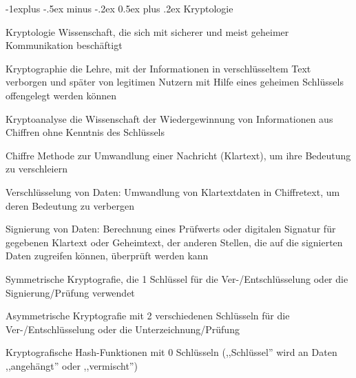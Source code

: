 \documentclass[a4paper]{article}
\makeatletter
\renewcommand{\subsection}{\@startsection{subsection}{2}{0mm}%
 {-1explus -.5ex minus -.2ex}%
 {0.5ex plus .2ex}%
 {\normalfont\normalsize\bfseries}}
\makeatother
\begin{document}
\begin{multicols}{3}
      \subsection{Kryptologie}
      \begin{description*}
            \item[Kryptologie] Wissenschaft, die sich mit sicherer und meist geheimer Kommunikation beschäftigt
            \item[Kryptographie] die Lehre, mit der Informationen in verschlüsseltem Text verborgen und später von legitimen Nutzern mit Hilfe eines geheimen Schlüssels offengelegt werden können
            \item[Kryptoanalyse] die Wissenschaft der Wiedergewinnung von Informationen aus Chiffren ohne Kenntnis des Schlüssels
            \item[Chiffre] Methode zur Umwandlung einer Nachricht (Klartext), um ihre Bedeutung zu verschleiern
            \item[Verschlüsselung] von Daten: Umwandlung von Klartextdaten in Chiffretext, um deren Bedeutung zu verbergen
            \item[Signierung] von Daten: Berechnung eines Prüfwerts oder digitalen Signatur für gegebenen Klartext oder Geheimtext, der anderen Stellen, die auf die signierten Daten zugreifen können, überprüft werden kann
            \item[Symmetrische] Kryptografie, die 1 Schlüssel für die Ver-/Entschlüsselung oder die Signierung/Prüfung verwendet
            \item[Asymmetrische] Kryptografie mit 2 verschiedenen Schlüsseln für die Ver-/Entschlüsselung oder die Unterzeichnung/Prüfung
            \item[Kryptografische Hash-Funktionen] mit 0 Schlüsseln (,,Schlüssel'' wird an Daten ,,angehängt'' oder ,,vermischt'')
      \end{description*}


\end{multicols}
\end{document}
